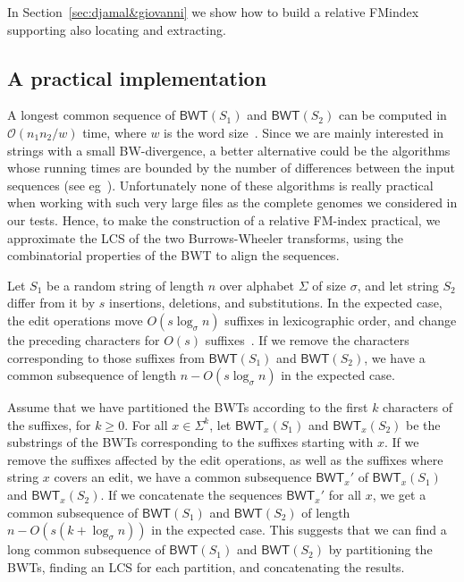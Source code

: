 \documentclass{llncs}
\newcommand{\Oh}[1]
  {\ensuremath{\mathcal{O}\!\left( {#1} \right)}}
\newcommand{\BWT}
  {\ensuremath{\mathsf{BWT}}}
\begin{document}
In Section~\ref{sec:djamal&giovanni} we show how to build a relative FMindex
supporting also locating and extracting.





\subsection{A practical implementation} \label{sec:simon&jouni}

A longest common sequence of $\BWT (S_1)$ and $\BWT (S_2)$ can be computed in
$\Oh{n_1 n_2 /w}$ time, where $w$ is the word size~\cite{Myers99}. Since we
are mainly interested in strings with a small BW-divergence, a better
alternative could be the algorithms whose running times are bounded by the number
of differences between the input sequences (see
eg~\cite{LandauVN86,Myers86}). Unfortunately none of these algorithms is
really practical when working with such very large files as the complete genomes
we considered in our tests. Hence, to make the construction of a relative
FM-index practical, we approximate the LCS of the two Burrows-Wheeler
transforms, using the combinatorial properties of the BWT to align the
sequences.

Let $S_{1}$ be a random string of length $n$ over alphabet $\Sigma$ of size
$\sigma$, and let string $S_{2}$ differ from it by $s$ insertions, deletions,
and substitutions. In the expected case, the edit operations move $O(s
\log_{\sigma} n)$ suffixes in lexicographic order, and change the preceding
characters for $O(s)$ suffixes~\cite{MNSV10}. If we remove the characters
corresponding to those suffixes from $\BWT(S_{1})$ and $\BWT(S_{2})$, we have
a common subsequence of length $n - O(s \log_{\sigma} n)$ in the expected
case.

Assume that we have partitioned the BWTs according to the first $k$
characters of the suffixes, for $k \ge 0$. For all $x \in \Sigma^{k}$, let
$\BWT_{x}(S_{1})$ and $\BWT_{x}(S_{2})$ be the substrings of the BWTs
corresponding to the suffixes starting with $x$. If we remove the suffixes
affected by the edit operations, as well as the suffixes where string $x$
covers an edit, we have a common subsequence $\BWT_{x}'$ of $\BWT_{x}(S_{1})$
and $\BWT_{x}(S_{2})$. If we concatenate the sequences $\BWT_{x}'$ for all
$x$, we get a common subsequence of $\BWT(S_{1})$ and $\BWT(S_{2})$ of length
$n - O(s (k + \log_{\sigma} n))$ in the expected case. This suggests that we
can find a long common subsequence of $\BWT(S_{1})$ and $\BWT(S_{2})$ by
partitioning the BWTs, finding an LCS for each partition, and concatenating the
results.
\end{document}
